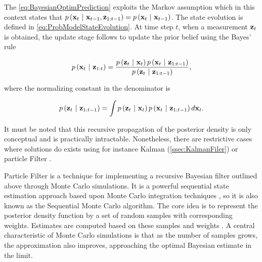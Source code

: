 \noindent The \cref{eq:BayesianOptimPrediction} exploits the Markov assumption which in this context states that $p \left( \mathbf{x}_t \ | \ \mathbf{x}_{t - 1}, \mathbf{z}_{1:t - 1} \right) = p \left( \mathbf{x}_t \ | \ \mathbf{x}_{t - 1} \right)$. The state evolution is defined in \cref{eq:ProbModelStateEvolution}. At time step $t$, when a measurement $\mathbf{z}_t$ is obtained, the update stage follows to update the prior belief using the Bayes' rule

\begin{equation}
    p \left( \mathbf{x}_t \ | \ \mathbf{z}_{1:t} \right) =
    \frac{
        p \left( \mathbf{z}_t \ | \ \mathbf{x}_{t} \right)
        p \left( \mathbf{x}_t \ | \ \mathbf{z}_{1:t - 1} \right)
    }{
        p \left( \mathbf{z}_t \ | \ \mathbf{z}_{1:t - 1} \right)
    },
\end{equation}

\noindent where the normalizing constant in the denominator is

\begin{equation}
    p \left( \mathbf{z}_t \ | \ \mathbf{z}_{1:t - 1} \right) =
    \int
    p \left( \mathbf{z}_t \ | \ \mathbf{x}_{t} \right)
    p \left( \mathbf{x}_t \ | \ \mathbf{z}_{1:t - 1} \right)
    d\mathbf{x}_t.
\end{equation}

\noindent It must be noted that this recursive propagation of the posterior density is only conceptual and is practically intractable. Nonetheless, there are restrictive cases where solutions do exists using for instance Kalman (\cref{ssec:KalmanFiler}) or particle Filter \cite{Arulampalam2007}.

Particle Filter is a technique for implementing a recursive Bayesian filter outlined above through Monte Carlo simulations.  It is a powerful sequential state estimation approach \cite{doucet2001introduction} based upon Monte Carlo integration techniques \cite{mihaylova2007object}, so it is also known as the Sequential Monte Carlo algorithm. The core idea is to represent the posterior density function by a set of random samples with corresponding weights. Estimates are computed based on these samples and weights \cite{Arulampalam2007}. A central characteristic of Monte Carlo simulations is that as the number of samples grows, the approximation also improves, approaching the optimal Bayesian estimate in the limit.

